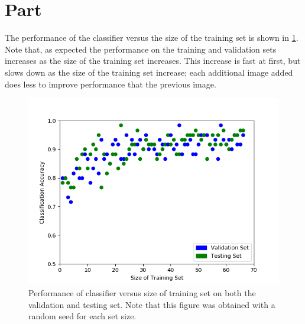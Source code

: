 \documentclass{article}
\newcommand{\enterproblemHeader}[1]{
}
\newcommand{\exitproblemHeader}[1]{
}
\newcounter{problem} %
\newcommand{\problemName}{}
\newenvironment{problem}[1][Part \theproblem]{ %
	\stepcounter{problem} %
	\renewcommand{\problemName}{#1} %
	\section{\problemName} %
	\enterproblemHeader{\problemName} %
}{
	\exitproblemHeader{\problemName} %
}
\begin{document}

\FloatBarrier
\begin{problem}
	The performance of the classifier versus the size of the training set is shown in \cref{fig:5a}. Note that, as expected the performance on the training and validation sets increases as the size of the training set increases. This increase is fast at first, but slows down as the size of the training set increase; each additional image added does less to improve performance that the previous image.
	\begin{figure}
		\includegraphics[width=\linewidth]{5}
		\caption{Performance of classifier versus size of training set on both the validation and testing set. Note that this figure was obtained with a random seed for each set size.}
		\label{fig:5a}
	\end{figure}
	

\end{problem}
\end{document}
